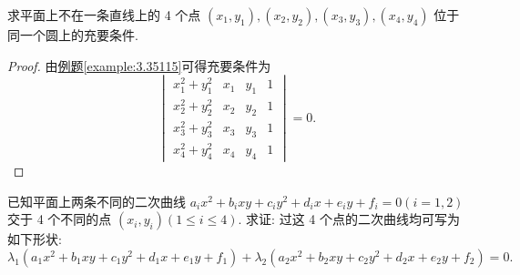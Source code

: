 \documentclass[../../main.tex]{subfiles}
\begin{document}
\begin{proposition}\label{proposition:平面上4点共圆的充要条件}
求平面上不在一条直线上的 4 个点 \((x_1,y_1),(x_2,y_2),(x_3,y_3),(x_4,y_4)\) 位于同一个圆上的充要条件.
\end{proposition}
\begin{proof}
由\hyperref[example:3.35115]{例题\ref{example:3.35115}}可得充要条件为
\[
\begin{vmatrix}
x_1^2 + y_1^2&x_1&y_1&1\\
x_2^2 + y_2^2&x_2&y_2&1\\
x_3^2 + y_3^2&x_3&y_3&1\\
x_4^2 + y_4^2&x_4&y_4&1
\end{vmatrix}=0.
\]
\end{proof}

\begin{example}
已知平面上两条不同的二次曲线 \(a_ix^2 + b_ixy + c_iy^2 + d_ix + e_iy + f_i = 0(i = 1,2)\) 交于 4 个不同的点 \((x_i,y_i)(1\leqslant  i\leqslant  4)\). 求证: 过这 4 个点的二次曲线均可写为如下形状:
\[
\lambda_1(a_1x^2 + b_1xy + c_1y^2 + d_1x + e_1y + f_1)+\lambda_2(a_2x^2 + b_2xy + c_2y^2 + d_2x + e_2y + f_2)=0.
\]
\end{example}
\end{document}
